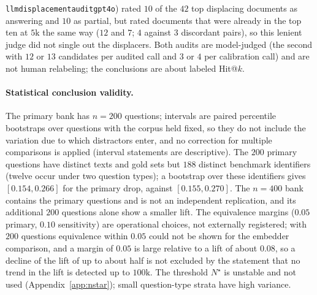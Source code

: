 \documentclass{ieeeaccess}
\makeatletter
\DeclareRobustCommand{\_}{\ifmmode\nfss@text{\textunderscore}\else\textunderscore\allowbreak\fi}
\makeatother
\begin{document}
\texttt{llm\_displacement\_audit\_gpt4o}) rated $10$ of the $42$ top displacing documents as answering and $10$ as partial, but rated documents that were already in the top ten at $5\text{k}$ the same way ($12$ and $7$; $4$ against $3$ discordant pairs), so this lenient judge did not single out the displacers. Both audits are model-judged (the second with $12$ or $13$ candidates per audited call and $3$ or $4$ per calibration call) and are not human relabeling; the conclusions are about labeled Hit@$k$.

\paragraph{Statistical conclusion validity.}
The primary bank has $n{=}200$ questions; intervals are paired percentile bootstraps over questions with the corpus held fixed, so they do not include the variation due to which distractors enter, and no correction for multiple comparisons is applied (interval statements are descriptive). The $200$ primary questions have distinct texts and gold sets but $188$ distinct benchmark identifiers (twelve occur under two question types); a bootstrap over these identifiers gives $[0.154,0.266]$ for the primary drop, against $[0.155,0.270]$. The $n{=}400$ bank contains the primary questions and is not an independent replication, and its additional $200$ questions alone show a smaller lift. The equivalence margins ($0.05$ primary, $0.10$ sensitivity) are operational choices, not externally registered; with $200$ questions equivalence within $0.05$ could not be shown for the embedder comparison, and a margin of $0.05$ is large relative to a lift of about $0.08$, so a decline of the lift of up to about half is not excluded by the statement that no trend in the lift is detected up to $100\text{k}$. The threshold $N^\star$ is unstable and not used (Appendix~\ref{app:nstar}); small question-type strata have high variance.
\end{document}
